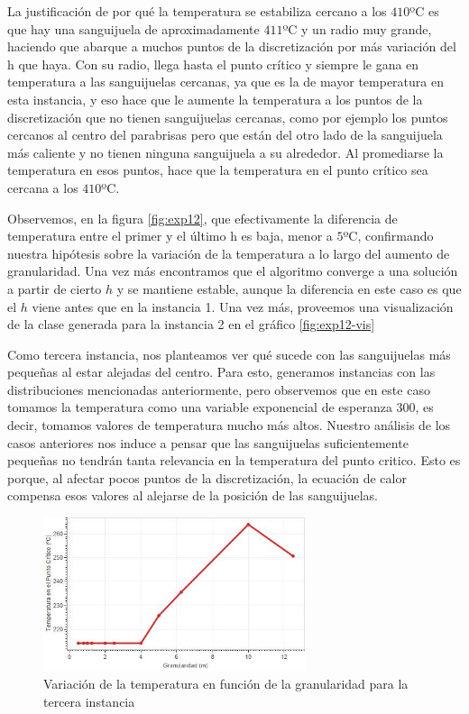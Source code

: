 La justificación de por qué la temperatura se estabiliza cercano a los $410$ºC es que hay una sanguijuela de aproximadamente $411$ºC y un radio muy grande, haciendo que abarque a muchos puntos de la discretización por más variación del h que haya. Con su radio, llega hasta el punto crítico y siempre le gana en temperatura a las sanguijuelas cercanas, ya que es la de mayor temperatura en esta instancia, y eso hace que le aumente la temperatura a los puntos de la discretización que no tienen sanguijuelas cercanas, como por ejemplo los puntos cercanos al centro del parabrisas pero que están del otro lado de la sanguijuela más caliente y no tienen ninguna sanguijuela a su alrededor. Al promediarse la temperatura en esos puntos, hace que la temperatura en el punto crítico sea cercana a los $410$ºC.

Observemos, en la figura \ref{fig:exp12}, que efectivamente la diferencia de temperatura entre el primer y el último h es baja, menor a $5$ºC, confirmando nuestra hipótesis sobre la variación de la temperatura a lo largo del aumento de granularidad. Una vez más encontramos que el algoritmo converge a una solución a partir de cierto $h$ y se mantiene estable, aunque la diferencia en este caso es que el $h$ viene antes que en la instancia 1. Una vez más, proveemos una visualización de la clase generada para la instancia 2 en el gráfico \ref{fig:exp12-vis}

Como tercera instancia, nos planteamos ver qué sucede con las sanguijuelas más pequeñas al estar alejadas del centro. Para esto, generamos instancias con las distribuciones mencionadas anteriormente, pero observemos que en este caso tomamos la temperatura como una variable exponencial de esperanza $300$, es decir, tomamos valores de temperatura mucho más altos. Nuestro análisis de los casos anteriores nos induce a pensar que las sanguijuelas suficientemente pequeñas no tendrán tanta relevancia en la temperatura del punto critico. Esto es porque, al afectar pocos puntos de la discretización, la ecuación de calor compensa esos valores al alejarse de la posición de las sanguijuelas. 

\begin{figure}[h]
    \centering
    \includegraphics[width=0.685\textwidth]{experimento 1-3}
    \caption{Variación de la temperatura en función de la granularidad para la tercera instancia}
    \label{fig:exp13}
\end{figure}


